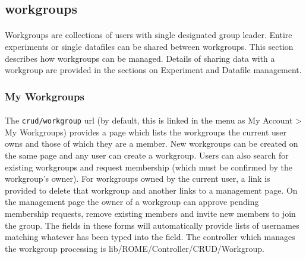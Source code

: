 \subsection{workgroups}
\label{sec:workgroups}

\paragraph{}
Workgroups are collections of users with single designated group leader. Entire experiments or single datafiles can be shared between workgroups. This section describes how workgroups can be managed. Details of sharing data with a workgroup are provided in the sections on Experiment and Datafile management.

\subsubsection{My Workgroups}
\paragraph{}
The \texttt{crud/workgroup} url (by default, this is linked in the menu as My Account > My Workgroups) provides a page which lists the workgroups the current user owns and those of which they are a member. New workgroups can be created on the same page and any user can create a workgroup. Users can also search for existing workgroups and request membership (which must be confirmed by the workgroup's owner). For workgroups owned by the current user, a link is provided to delete that workgroup and another links to a management page. On the management page the owner of a workgroup can approve pending membership requests, remove existing members and invite new members to join the group.  The fields in these forms will automatically provide lists of usernames matching whatever has been typed into the field. The controller which manages the workgroup processing is lib/ROME/Controller/CRUD/Workgroup. 